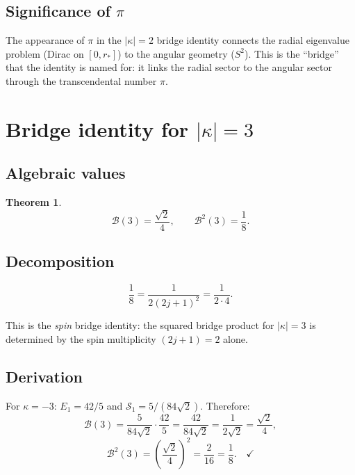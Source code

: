 \documentclass[11pt,letterpaper]{article}
\newtheorem{theorem}{Theorem}[section]
\numberwithin{equation}{section}
\begin{document}
\subsection{Significance of $\pi$}

The appearance of $\pi$ in the $|\kappa| = 2$ bridge identity connects the
radial eigenvalue problem (Dirac on $[0, r_*]$) to the angular geometry
($S^2$). This is the ``bridge'' that the identity is named for: it links the
radial sector to the angular sector through the transcendental number $\pi$.

\section{Bridge identity for $|\kappa| = 3$}
\label{sec:kappa3}

\subsection{Algebraic values}

\begin{theorem}
\begin{equation}
\label{eq:bridge_k3}
  \mathcal{B}(3) = \frac{\sqrt{2}}{4}, \qquad
  \mathcal{B}^2(3) = \frac{1}{8}.
\end{equation}
\end{theorem}

\subsection{Decomposition}

\begin{equation}
\label{eq:k3_decomp}
\boxed{
  \frac{1}{8} = \frac{1}{2(2j+1)^2} = \frac{1}{2 \cdot 4}.
}
\end{equation}

This is the \emph{spin} bridge identity: the squared bridge product for
$|\kappa| = 3$ is determined by the spin multiplicity $(2j+1) = 2$ alone.

\subsection{Derivation}

For $\kappa = -3$: $E_1 = 42/5$ and $\mathcal{S}_1 = 5/(84\sqrt{2})$.
Therefore:
\begin{equation}
  \mathcal{B}(3) = \frac{5}{84\sqrt{2}} \cdot \frac{42}{5}
  = \frac{42}{84\sqrt{2}} = \frac{1}{2\sqrt{2}} = \frac{\sqrt{2}}{4},
\end{equation}
\begin{equation}
  \mathcal{B}^2(3) = \left(\frac{\sqrt{2}}{4}\right)^2 = \frac{2}{16} = \frac{1}{8}. \quad \checkmark
\end{equation}
\end{document}
